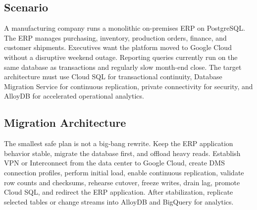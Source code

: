 \subsection{Scenario}
A manufacturing company runs a monolithic on-premises ERP on PostgreSQL. The ERP manages purchasing, inventory, production orders, finance, and customer shipments. Executives want the platform moved to Google Cloud without a disruptive weekend outage. Reporting queries currently run on the same database as transactions and regularly slow month-end close. The target architecture must use Cloud SQL for transactional continuity, Database Migration Service for continuous replication, private connectivity for security, and AlloyDB for accelerated operational analytics.

\subsection{Migration Architecture}
The smallest safe plan is not a big-bang rewrite. Keep the ERP application behavior stable, migrate the database first, and offload heavy reads. Establish VPN or Interconnect from the data center to Google Cloud, create DMS connection profiles, perform initial load, enable continuous replication, validate row counts and checksums, rehearse cutover, freeze writes, drain lag, promote Cloud SQL, and redirect the ERP application. After stabilization, replicate selected tables or change streams into AlloyDB and BigQuery for analytics.

